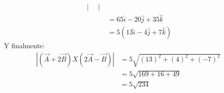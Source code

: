 \documentclass[12pt,openany]{book}
\begin{document}
\begin{itemize}
\begin{equation*}
\begin{split}
\begin{vmatrix}
											 	    									\end{vmatrix}\\
											 	    					   &=65\hat{i}-20\hat{j}+35\hat{k} \\
											 	    					   &=5(13\hat{i}-4\hat{j}+7\hat{k})
									\end{split}
								\end{equation*}
								Y finalmente:
								\begin{equation*}
									\begin{split}
										|(\vec{A}+2\vec{B})X(2\vec{A}-\vec{B})|&=5\sqrt{(13)^{2}+(4)^{2}+(-7)^{2}} \\
																				&=5\sqrt{169+16+49}				   \\
																				&=5\sqrt{234}
									\end{split}
								\end{equation*}
					\end{itemize}
					
\end{document}
